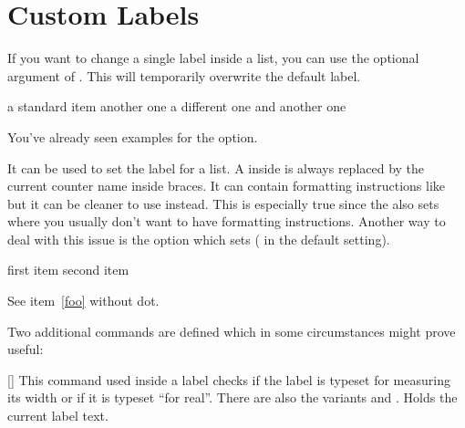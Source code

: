 \documentclass{tasks-manual}
\begin{document}
\section{Custom Labels}
If you want to change a single label inside a list, you can use the optional
argument of . This will temporarily overwrite the default label.
\begin{example}
  \begin{tasks}[style=itemize]
    \task a standard item
    \task another one
    \task[+] a different one
    \task and another one
  \end{tasks}
\end{example}

You've already seen examples for the  option.
\begin{options}
    It can be used to set the label for a list.  A \code{*} inside is always
    replaced by the current counter name inside braces.  It can contain
    formatting instructions like  but it can be cleaner to use
  \Default
    instead.  This is especially true since the  also sets
     where you usually don't want to have formatting
    instructions.  Another way to deal with this issue is the option
  \Default
    which sets  ( in the default setting).
\end{options}

\begin{example}
  \begin{tasks}[label=\arabic*.,ref=\arabic*]
    \task first item
    \task second item \label{foo}
  \end{tasks}
  See item~\ref{foo} without dot.
\end{example}

Two additional commands are defined which in some circumstances might prove
useful:
\begin{commands}
  []
    This command used inside a label checks if the label is
    typeset for measuring its width or if it is typeset \enquote{for
      real}.  There are also the variants  and
    .
    Holds the current label text.
\end{commands}
\end{document}
